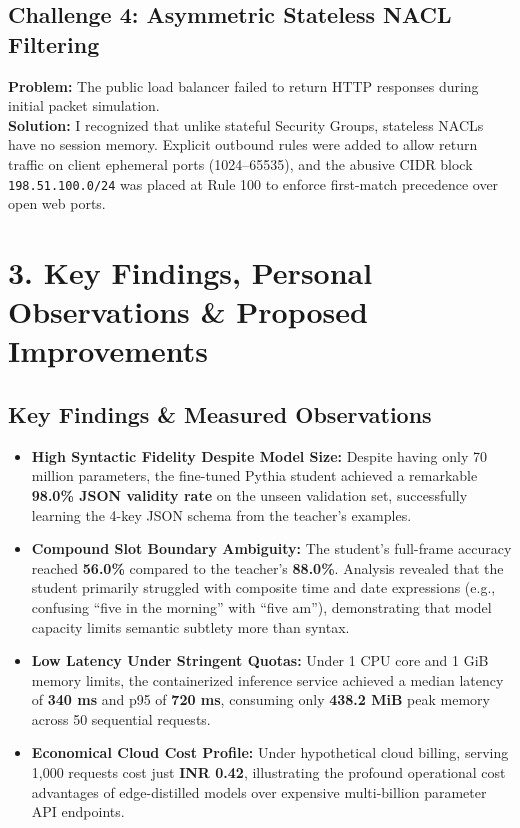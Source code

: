 \documentclass[11pt,a4paper]{article}
\begin{document}
\subsection*{Challenge 4: Asymmetric Stateless NACL Filtering}
\textbf{Problem:} The public load balancer failed to return HTTP responses during initial packet simulation.\\
\textbf{Solution:} I recognized that unlike stateful Security Groups, stateless NACLs have no session memory. Explicit outbound rules were added to allow return traffic on client ephemeral ports (1024--65535), and the abusive CIDR block \texttt{198.51.100.0/24} was placed at Rule 100 to enforce first-match precedence over open web ports.

\newpage

\section*{3. Key Findings, Personal Observations \& Proposed Improvements}

\subsection*{Key Findings \& Measured Observations}
\begin{itemize}
    \item \textbf{High Syntactic Fidelity Despite Model Size:} Despite having only 70 million parameters, the fine-tuned Pythia student achieved a remarkable \textbf{98.0\% JSON validity rate} on the unseen validation set, successfully learning the 4-key JSON schema from the teacher's examples.
    \item \textbf{Compound Slot Boundary Ambiguity:} The student's full-frame accuracy reached \textbf{56.0\%} compared to the teacher's \textbf{88.0\%}. Analysis revealed that the student primarily struggled with composite time and date expressions (e.g., confusing ``five in the morning'' with ``five am''), demonstrating that model capacity limits semantic subtlety more than syntax.
    \item \textbf{Low Latency Under Stringent Quotas:} Under 1 CPU core and 1 GiB memory limits, the containerized inference service achieved a median latency of \textbf{340 ms} and p95 of \textbf{720 ms}, consuming only \textbf{438.2 MiB} peak memory across 50 sequential requests.
    \item \textbf{Economical Cloud Cost Profile:} Under hypothetical cloud billing, serving 1,000 requests cost just \textbf{INR 0.42}, illustrating the profound operational cost advantages of edge-distilled models over expensive multi-billion parameter API endpoints.
\end{itemize}
\end{document}
